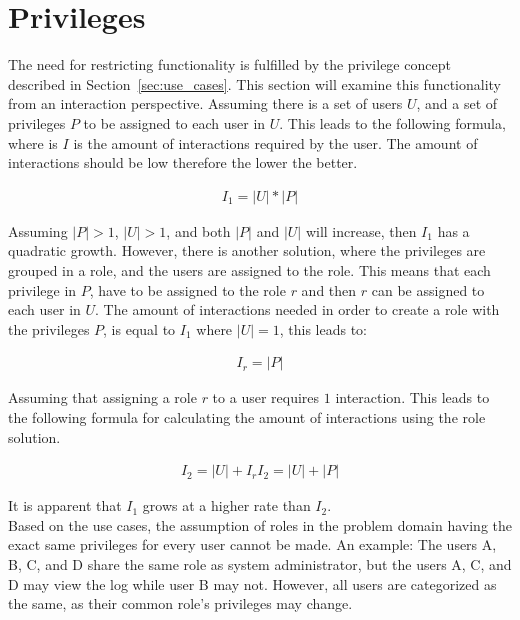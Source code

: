 \section{Privileges}
The need for restricting functionality is fulfilled by the privilege concept described in Section~\ref{sec:use_cases}. This section will examine this functionality from an interaction perspective. Assuming there is a set of users $U$, and a set of privileges $P$ to be assigned to each user in $U$. This leads to the following formula, where is $I$ is the amount of interactions required by the user. The amount of interactions should be low therefore the lower the better.

\begin{align}
I_1 = |U|*|P|
\end{align}

Assuming $|P| > 1$, $|U| > 1$, and both $|P|$ and $|U|$ will increase, then $I_1$ has a quadratic growth. However, there is another solution, where the privileges are grouped in a role, and the users are assigned to the role. This means that each privilege in $P$, have to be assigned to the role $r$ and then $r$ can be assigned to each user in $U$. The amount of interactions needed in order to create a role with the privileges $P$, is equal to $I_1$ where $|U| = 1$, this leads to:

\begin{align}
I_r = |P|
\end{align}

Assuming that assigning a role $r$ to a user requires $1$ interaction. This leads to the following formula for calculating the amount of interactions using the role solution.

\begin{align}
I_2 = |U|+I_r
I_2 = |U|+|P|
\end{align}

It is apparent that $I_1$ grows at a higher rate than $I_2$. \\

Based on the use cases, the assumption of roles in the problem domain having the exact same privileges for every user cannot be made. An example: The users A, B, C, and D share the same role as system administrator, but the users A, C, and D may view the log while user B may not. However, all users are categorized as the same, as their common role's privileges may change. \\

